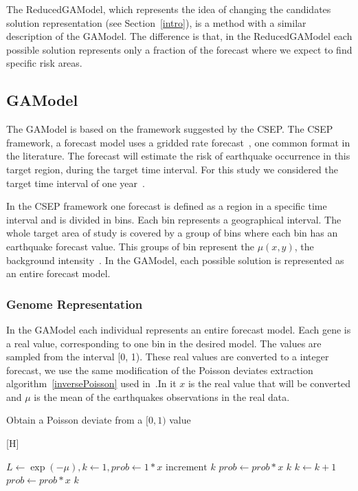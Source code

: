 The ReducedGAModel, which represents the idea of changing the
candidates solution representation (see Section~\ref{intro}), is a
method with a similar description of the GAModel. The difference is
that, in the ReducedGAModel each possible solution represents only a
fraction of the forecast where we expect to find specific risk areas.


\subsection{GAModel}\label{GAModel}
The GAModel is based on the framework suggested by the CSEP. The CSEP framework, a forecast model uses a gridded rate
forecast~\cite{zechar2010evaluating}, one common format in the
literature. The forecast will estimate the risk of earthquake occurrence in this target region, during the target time interval. For this study we considered the target time interval of one year~\cite{ecta14}.

 In the CSEP framework one forecast is defined as a region in a specific time interval and is divided in bins. Each bin represents a geographical interval. The whole target area of study is covered by a group of bins where each bin has an earthquake forecast value. This groups of bin represent the $\mu(x,y)$, the background intensity~\cite{zhuang2004analyzing}. In the GAModel, each possible solution is represented as an entire forecast model.

\subsubsection{Genome Representation}\label{genomeGA}
In the GAModel each individual represents an entire forecast model. Each gene is a real value, corresponding to one bin in the desired model. The values are sampled from the interval [0, 1). These real values are converted to a integer forecast, we use the same modification of the Poisson deviates extraction algorithm~\ref{inversePoisson} used in~\cite{ecta14}.In it $x$ is the real value that will be converted and $\mu$ is the mean of the earthquakes observations in the real data.

\begin{algorithm}\label{inversePoisson}
	\caption{Obtain a Poisson deviate from a $[0,1)$ value}
	\label{InversePoisson}[H]
	\begin{algorithmic}
		\STATE $L \gets \exp{(-\mu)}, k \gets 1, prob \gets 1 * x$
		\REPEAT 
		\STATE $\text{increment }k$
		\STATE $prob \gets prob*x$
		\RETURN $k$
		\STATE $k \gets k + 1$
		\STATE $prob \gets prob*x$
		\ENDWHILE
		\RETURN $k$
	\end{algorithmic}
\end{algorithm}

